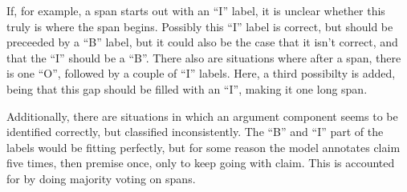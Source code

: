 \documentclass[12]{article}
\theoremstyle{mytheoremstyle}
\theoremstyle{mytheoremstyle}
\theoremstyle{myproblemstyle}
\begin{document}
  If, for example, a span starts out with an ``I'' label, it is unclear whether this truly is where the span begins. 
  Possibly this ``I'' label is correct, but should be preceeded by a ``B'' label, but it could also be the case that it isn't correct, and that the ``I'' should be a ``B''. 
  There also are situations where after a span, there is one ``O'', followed by a couple of ``I'' labels. 
  Here, a third possibilty is added, being that this gap should be filled with an ``I'', making it one long span.

  Additionally, there are situations in which an argument component seems to be identified correctly, but classified inconsistently. 
  The ``B'' and ``I'' part of the labels would be fitting perfectly, but for some reason the model annotates claim five times, then premise once, only to keep going with claim. 
  This is accounted for by doing majority voting on spans.
\end{document}
